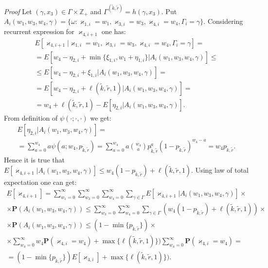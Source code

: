 \textit{{Proof}} 
Let $(\gamma, x_3) \in \Gamma \times {\mathbb Z}_+$ and  $\Gamma^{(\tilde{k},\tilde{r})}=h(\gamma,x_3)$. Put 
$A_i(w_1,w_3,w_4,\gamma) = \{\omega \colon \varkappa_{1,i}=w_1,\varkappa_{3,i}=w_3, \varkappa_{4,i}=w_4, \Gamma_i=\gamma \}$. Considering recurrent expression for $\varkappa_{4,i+1}$ one has:
\begin{multline*}
    E[\varkappa_{4,i+1} | \varkappa_{1,i}=w_1,\varkappa_{3,i}=w_3, \varkappa_{4,i}=w_4, \Gamma_i=\gamma] = \\
    =
    E[w_4 - \eta_{2,i} +  \min{\{\xi_{1,i}, w_1 + \eta_{1,i} \}} | A_i(w_1,w_3,w_4,\gamma)] \leqslant \\
    \leqslant
     E[w_4 - \eta_{2,i} +  \xi_{1,i} | A_i(w_1,w_3,w_4,\gamma)] =\\ 
     = 
     E[w_4 - \eta_{2,i} +  \ell(\tilde{k},\tilde{r},1) | A_i(w_1,w_3,w_4,\gamma)] = \\ 
    =
   w_4 + \ell(\tilde{k},\tilde{r},1)  -  E[\eta_{2,i} |A_i(w_1,w_3,w_4,\gamma)].
\end{multline*}
From definition of $\psi(\cdot;\cdot,\cdot)$ we get:
\begin{multline*}
  E[\eta_{2,i} | A_i(w_1,w_3,w_4,\gamma)]
=\\ =
\sum_{a=0}^{w_4}  a \psi(a;w_4, p_{\tilde{k},\tilde{r}}) = 
\sum_{a=0}^{w_4} a {{w_4}\choose{a}} p_{\tilde{k},\tilde{r}}^a (1-p_{\tilde{k},\tilde{r}})^{w_4-a} = w_4 p_{\tilde{k},\tilde{r}}.
\end{multline*}
Hence it is true that
   $  E[\varkappa_{4,i+1} | A_i(w_1,w_3,w_4,\gamma)] \leqslant
     w_4 (1-p_{\tilde{k},\tilde{r}}) + \ell(\tilde{k},\tilde{r},1)$.
Using law of total expectation one can get:
\begin{multline*}
    E[\varkappa_{4,i+1}]
    =\sum_{w_1=0}^{\infty} \sum_{w_3=0}^{\infty}  \sum_{w_4=0}^{\infty} \sum_{\gamma \in \Gamma}  E[\varkappa_{4,i+1} | A_i(w_1,w_3,w_4,\gamma)]  \times \\ 
    \times
    {\mathbf P}( A_i(w_1,w_3,w_4,\gamma))  
    \leqslant
    \sum_{w_3=0}^{\infty}  \sum_{w_4=0}^{\infty} \sum_{\gamma \in \Gamma} 
    ( w_4 (1-p_{\tilde{k},\tilde{r}}) + \ell(\tilde{k},\tilde{r},1) ) \times \\   \times 
    {\mathbf P}( A_i(w_1,w_3,w_4,\gamma)) 
    \leqslant
     (1-\min{\{p_{\tilde{k},\tilde{r}}\}}) \times \\ \times \sum_{w_4=0}^{\infty}   w_4 {\mathbf P}(\varkappa_{4,i}=w_4) + \max{\{\ell(\tilde{k},\tilde{r},1)\}} )   \sum_{w_4=0}^{\infty}{\mathbf P}(\varkappa_{4,i}=w_4) = \\
     =
      (1-\min{\{p_{\tilde{k},\tilde{r}}\}})  E[\varkappa_{4,i}] + \max{\{\ell(\tilde{k},\tilde{r},1)\}} ).
\end{multline*}

